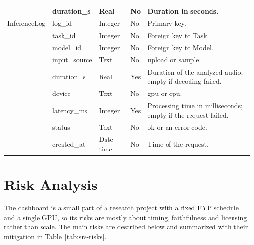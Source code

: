 \documentclass{FastFyp}
\begin{document}
{\begin{longtable}{P{2.8cm}P{2.6cm}P{1.6cm}P{1.4cm}P{5.35cm}}
 & duration\_s & Real & No & Duration in seconds.\\
\midrule
InferenceLog & log\_id & Integer & No & Primary key.\\
 & task\_id & Integer & No & Foreign key to Task.\\
 & model\_id & Integer & No & Foreign key to Model.\\
 & input\_source & Text & No & upload or sample.\\
 & duration\_s & Real & Yes & Duration of the analyzed audio; empty if decoding failed.\\
 & device & Text & No & gpu or cpu.\\
 & latency\_ms & Integer & Yes & Processing time in milliseconds; empty if the request failed.\\
 & status & Text & No & ok or an error code.\\
 & created\_at & Date-time & No & Time of the request.\\
\end{longtable}}

\section{Risk Analysis}
\label{sec:srs-risks}
The dashboard is a small part of a research project with a fixed FYP schedule and a single GPU, so its risks are mostly about timing, faithfulness and licensing rather than scale. The main risks are described below and summarized with their mitigation in Table~\ref{tab:srs-risks}.
\end{document}
